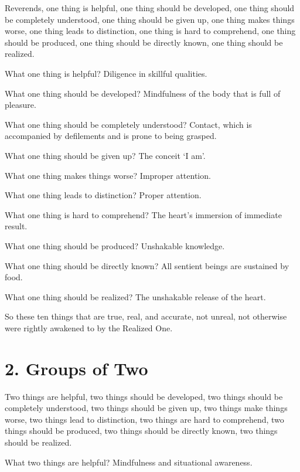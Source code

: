 \documentclass[12pt,openany]{book}%
\begin{document}
Reverends, one thing is helpful, one thing should be developed, one thing should be completely understood, one thing should be given up, one thing makes things worse, one thing leads to distinction, one thing is hard to comprehend, one thing should be produced, one thing should be directly known, one thing should be realized. 

What one thing is helpful? Diligence in skillful qualities. 

What one thing should be developed? Mindfulness of the body that is full of pleasure. 

What one thing should be completely understood? Contact, which is accompanied by defilements and is prone to being grasped. 

What one thing should be given up? The conceit ‘I am’. 

What one thing makes things worse? Improper attention. 

What one thing leads to distinction? Proper attention. 

What one thing is hard to comprehend? The heart’s immersion of immediate result. 

What one thing should be produced? Unshakable knowledge. 

What one thing should be directly known? All sentient beings are sustained by food. 

What one thing should be realized? The unshakable release of the heart. 

So these ten things that are true, real, and accurate, not unreal, not otherwise were rightly awakened to by the Realized One. 

\section*{2. Groups of Two }

Two things are helpful, two things should be developed, two things should be completely understood, two things should be given up, two things make things worse, two things lead to distinction, two things are hard to comprehend, two things should be produced, two things should be directly known, two things should be realized. 

What two things are helpful? Mindfulness and situational awareness. 
\end{document}
